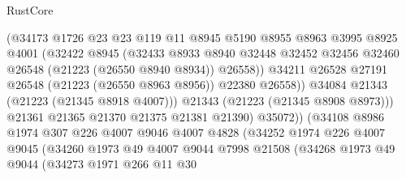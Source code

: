 \begin{lexlean}{RustCore}
\begin{coremodule}
                              (@34173
                                @1726
                                @23
                                @23
                                @119
                                @11
                                @8945
                                @5190
                                @8955
                                @8963
                                @3995
                                @8925
                                @4001
                                (@32422
                                  @8945
                                  (@32433
                                    @8933
                                    @8940
                                    @32448
                                    @32452
                                    @32456
                                    @32460
                                    @26548
                                    (@21223 (@26550 @8940 @8934))
                                    @26558))
                                @34211
                                @26528
                                @27191
                                @26548
                                (@21223 (@26550 @8963 @8956))
                                @22380
                                @26558))
                            @34084
                            @21343
                            (@21223 (@21345 @8918 @4007)))
                          @21343
                          (@21223 (@21345 @8908 @8973)))
                        @21361
                        @21365
                        @21370
                        @21375
                        @21381
                        @21390)
                      @35072))
                  (@34108
                    @8986
                    @1974
                    @307
                    @226
                    @4007
                    @9046
                    @4007
                    @4828
                    (@34252
                      @1974
                      @226
                      @4007
                      @9045
                      (@34260
                        @1973
                        @49
                        @4007
                        @9044
                        @7998
                        @21508
                        (@34268
                          @1973
                          @49
                          @9044
                          (@34273
                            @1971
                            @266
                            @11
                            @30

\end{coremodule}
\end{lexlean}

